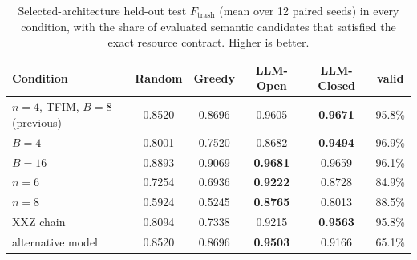 \documentclass[11pt]{article}
\begin{document}
\begin{table}[t]
\centering\small
\caption{Selected-architecture held-out test $F_{\mathrm{trash}}$ (mean over 12
paired seeds) in every condition, with the share of evaluated semantic
candidates that satisfied the exact resource contract. Higher is better.}
\label{tab:robustness-means}
\begin{tabular}{lccccc}
\toprule
Condition & Random & Greedy & LLM-Open & LLM-Closed & valid \\
\midrule
$n{=}4$, TFIM, $B{=}8$ (previous) & 0.8520 & 0.8696 & 0.9605 & \textbf{0.9671} & 95.8\% \\
$B{=}4$ & 0.8001 & 0.7520 & 0.8682 & \textbf{0.9494} & 96.9\% \\
$B{=}16$ & 0.8893 & 0.9069 & \textbf{0.9681} & 0.9659 & 96.1\% \\
$n{=}6$ & 0.7254 & 0.6936 & \textbf{0.9222} & 0.8728 & 84.9\% \\
$n{=}8$ & 0.5924 & 0.5245 & \textbf{0.8765} & 0.8013 & 88.5\% \\
XXZ chain & 0.8094 & 0.7338 & 0.9215 & \textbf{0.9563} & 95.8\% \\
alternative model & 0.8520 & 0.8696 & \textbf{0.9503} & 0.9166 & 65.1\% \\
\bottomrule
\end{tabular}
\end{table}
\end{document}
